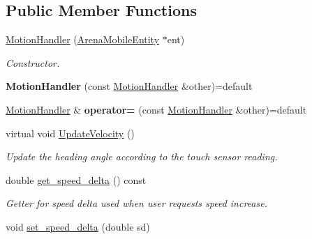 \subsection*{Public Member Functions}
\begin{DoxyCompactItemize}
\item 
\hyperlink{classMotionHandler_a48c0070bfda6acb8a7493eb7fe1200c4}{Motion\+Handler} (\hyperlink{classArenaMobileEntity}{Arena\+Mobile\+Entity} $\ast$ent)\hypertarget{classMotionHandler_a48c0070bfda6acb8a7493eb7fe1200c4}{}\label{classMotionHandler_a48c0070bfda6acb8a7493eb7fe1200c4}

\begin{DoxyCompactList}\small\item\em Constructor. \end{DoxyCompactList}\item 
{\bfseries Motion\+Handler} (const \hyperlink{classMotionHandler}{Motion\+Handler} \&other)=default\hypertarget{classMotionHandler_a91dc98beab9d5ccce6b6c18ce32c0488}{}\label{classMotionHandler_a91dc98beab9d5ccce6b6c18ce32c0488}

\item 
\hyperlink{classMotionHandler}{Motion\+Handler} \& {\bfseries operator=} (const \hyperlink{classMotionHandler}{Motion\+Handler} \&other)=default\hypertarget{classMotionHandler_ad45188f2d9794fd2b257d586a7b522e6}{}\label{classMotionHandler_ad45188f2d9794fd2b257d586a7b522e6}

\item 
virtual void \hyperlink{classMotionHandler_ad9bfac3d0ec3cec1d607f41475886c3c}{Update\+Velocity} ()\hypertarget{classMotionHandler_ad9bfac3d0ec3cec1d607f41475886c3c}{}\label{classMotionHandler_ad9bfac3d0ec3cec1d607f41475886c3c}

\begin{DoxyCompactList}\small\item\em Update the heading angle according to the touch sensor reading. \end{DoxyCompactList}\item 
double \hyperlink{classMotionHandler_a7a9b503e3da267c7af25d58daff5f216}{get\+\_\+speed\+\_\+delta} () const \hypertarget{classMotionHandler_a7a9b503e3da267c7af25d58daff5f216}{}\label{classMotionHandler_a7a9b503e3da267c7af25d58daff5f216}

\begin{DoxyCompactList}\small\item\em Getter for speed delta used when user requests speed increase. \end{DoxyCompactList}\item 
void \hyperlink{classMotionHandler_a908b330346b3fe969684106bd5c7619d}{set\+\_\+speed\+\_\+delta} (double sd)\hypertarget{classMotionHandler_a908b330346b3fe969684106bd5c7619d}{}\label{classMotionHandler_a908b330346b3fe969684106bd5c7619d}


\end{DoxyCompactItemize}
